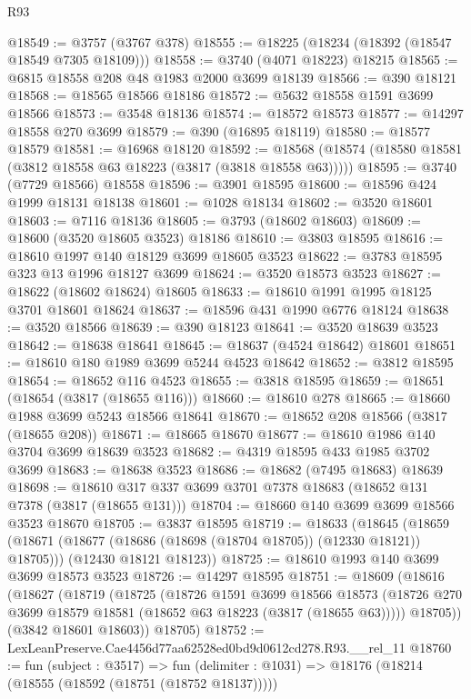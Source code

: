 \begin{lexlean}{R93}
\begin{coremodule}
@18549 := @3757 (@3767 @378)
@18555 := @18225 (@18234 (@18392 (@18547 @18549 @7305 @18109)))
@18558 := @3740 (@4071 @18223) @18215
@18565 := @6815 @18558 @208 @48 @1983 @2000 @3699 @18139
@18566 := @390 @18121
@18568 := @18565 @18566 @18186
@18572 := @5632 @18558 @1591 @3699 @18566
@18573 := @3548 @18136
@18574 := @18572 @18573
@18577 := @14297 @18558 @270 @3699
@18579 := @390 (@16895 @18119)
@18580 := @18577 @18579
@18581 := @16968 @18120
@18592 := @18568 (@18574 (@18580 @18581 (@3812 @18558 @63 @18223 (@3817 (@3818 @18558 @63)))))
@18595 := @3740 (@7729 @18566) @18558
@18596 := @3901 @18595
@18600 := @18596 @424 @1999 @18131 @18138
@18601 := @1028 @18134
@18602 := @3520 @18601
@18603 := @7116 @18136
@18605 := @3793 (@18602 @18603)
@18609 := @18600 (@3520 @18605 @3523) @18186
@18610 := @3803 @18595
@18616 := @18610 @1997 @140 @18129 @3699 @18605 @3523
@18622 := @3783 @18595 @323 @13 @1996 @18127 @3699
@18624 := @3520 @18573 @3523
@18627 := @18622 (@18602 @18624) @18605
@18633 := @18610 @1991 @1995 @18125 @3701 @18601 @18624
@18637 := @18596 @431 @1990 @6776 @18124
@18638 := @3520 @18566
@18639 := @390 @18123
@18641 := @3520 @18639 @3523
@18642 := @18638 @18641
@18645 := @18637 (@4524 @18642) @18601
@18651 := @18610 @180 @1989 @3699 @5244 @4523 @18642
@18652 := @3812 @18595
@18654 := @18652 @116 @4523
@18655 := @3818 @18595
@18659 := @18651 (@18654 (@3817 (@18655 @116)))
@18660 := @18610 @278
@18665 := @18660 @1988 @3699 @5243 @18566 @18641
@18670 := @18652 @208 @18566 (@3817 (@18655 @208))
@18671 := @18665 @18670
@18677 := @18610 @1986 @140 @3704 @3699 @18639 @3523
@18682 := @4319 @18595 @433 @1985 @3702 @3699
@18683 := @18638 @3523
@18686 := @18682 (@7495 @18683) @18639
@18698 := @18610 @317 @337 @3699 @3701 @7378 @18683 (@18652 @131 @7378 (@3817 (@18655 @131)))
@18704 := @18660 @140 @3699 @3699 @18566 @3523 @18670
@18705 := @3837 @18595
@18719 := @18633
    (@18645
      (@18659 (@18671 (@18677 (@18686 (@18698 (@18704 @18705)) (@12330 @18121)) @18705)))
      (@12430 @18121 @18123))
@18725 := @18610 @1993 @140 @3699 @3699 @18573 @3523
@18726 := @14297 @18595
@18751 := @18609
    (@18616
      (@18627
        (@18719
          (@18725
            (@18726
              @1591
              @3699
              @18566
              @18573
              (@18726 @270 @3699 @18579 @18581 (@18652 @63 @18223 (@3817 (@18655 @63)))))
            @18705))
        (@3842 @18601 @18603))
      @18705)
@18752 := LexLeanPreserve.Cae4456d77aa62528ed0bd9d0612cd278.R93.__rel_11
@18760 := fun (subject : @3517) =>
  fun (delimiter : @1031) => @18176 (@18214 (@18555 (@18592 (@18751 (@18752 @18137)))))

\end{coremodule}
\end{lexlean}
